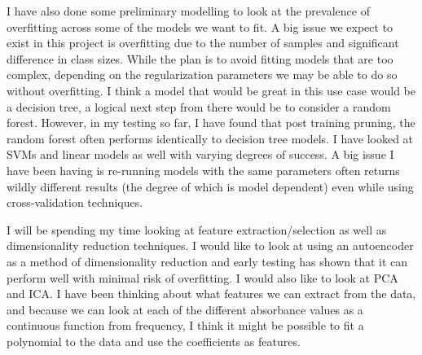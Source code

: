 \documentclass[11pt,a4paper]{article}
\begin{document}
I have also done some preliminary modelling to look at the prevalence of overfitting across some of the models we want to fit. A big issue we expect to exist in this project is overfitting due to the number of samples and significant difference in class sizes. While the plan is to avoid fitting models that are too complex, depending on the regularization parameters we may be able to do so without overfitting. I think a model that would be great in this use case would be a decision tree, a logical next step from there would be to consider a random forest. However, in my testing so far, I have found that post training pruning, the random forest often performs identically to decision tree models. I have looked at SVMs and linear models as well with varying degrees of success. A big issue I have been having is re-running models with the same parameters often returns wildly different results (the degree of which is model dependent) even while using cross-validation techniques. 

I will be spending my time looking at feature extraction/selection as well as dimensionality reduction techniques. I would like to look at using an autoencoder as a method of dimensionality reduction and early testing has shown that it can perform well with minimal risk of overfitting. I would also like to look at PCA and ICA. I have been thinking about what features we can extract from the data, and because we can look at each of the different absorbance values as a continuous function from frequency, I think it might be possible to fit a polynomial to the data and use the coefficients as features. 



\end{document}

